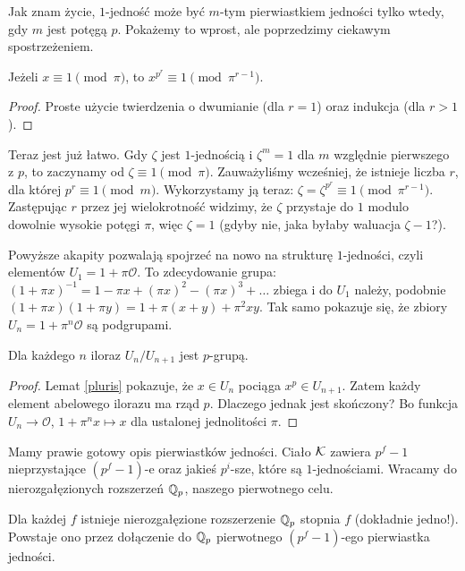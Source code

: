 Jak znam życie, $1$-jedność może być $m$-tym pierwiastkiem jedności tylko wtedy, gdy $m$ jest potęgą $p$.
Pokażemy to wprost, ale poprzedzimy ciekawym spostrzeżeniem.

\begin{lemat}\label{pluris}
	Jeżeli $x \equiv 1 \pmod \pi$, to $x^{p^r} \equiv 1 \pmod {\pi^{r-1}}$.
\end{lemat}

\begin{proof}
	Proste użycie twierdzenia o dwumianie (dla $r = 1$) oraz indukcja (dla $r >1$).
\end{proof}

Teraz jest już łatwo.
Gdy $\zeta$ jest $1$-jednością i $\zeta^m = 1$ dla $m$ względnie pierwszego z $p$, to zaczynamy od $\zeta \equiv 1 \pmod \pi$.
Zauważyliśmy wcześniej, że istnieje liczba $r$, dla której $p^r \equiv 1 \pmod m$.
Wykorzystamy ją teraz: $\zeta = \zeta^{p^r} \equiv 1 \pmod {\pi^{r-1}}$.
Zastępując $r$ przez jej wielokrotność widzimy, że $\zeta$ przystaje do $1$ modulo dowolnie wysokie potęgi $\pi$, więc $\zeta = 1$ (gdyby nie, jaka byłaby waluacja $\zeta - 1$?).

Powyższe akapity pozwalają spojrzeć na nowo na strukturę $1$-jedności, czyli elementów $U_1 = 1 + \pi \mathcal O$.
To zdecydowanie grupa: $(1+\pi x)^{-1} = 1 - \pi x + (\pi x)^2 - (\pi x)^3 + \dots$ zbiega i do $U_1$ należy, podobnie $(1+\pi x) (1+ \pi y) = 1 + \pi (x+y) + \pi^2xy$.
Tak samo pokazuje się, że zbiory $U_n = 1 + \pi^n \mathcal O$ są podgrupami.

\begin{wniosek}
	Dla każdego $n$ iloraz $U_n / U_{n+1}$ jest $p$-grupą.
\end{wniosek}

\begin{proof}
	Lemat \ref{pluris} pokazuje, że $x \in U_n$ pociąga $x^p \in U_{n+1}$.
	Zatem każdy element abelowego ilorazu ma rząd $p$.
	Dlaczego jednak jest skończony?
	Bo funkcja $U_n \to \mathcal O$, $1 + \pi^n x \mapsto x$ dla ustalonej jednolitości $\pi$.
\end{proof}

Mamy prawie gotowy opis pierwiastków jedności.
Ciało $\mathcal K$ zawiera $p^f-1$ nieprzystające $(p^f-1)$-e oraz jakieś $p^i$-sze, które są $1$-jednościami.
Wracamy do nierozgałęzionych rozszerzeń $\mathbb Q_p$, naszego pierwotnego celu.

\begin{fakt}
	Dla każdej $f$ istnieje nierozgałęzione rozszerzenie $\mathbb Q_p$ stopnia $f$ (dokładnie jedno!).
	Powstaje ono przez dołączenie do $\mathbb Q_p$ pierwotnego $(p^f-1)$-ego pierwiastka jedności.
\end{fakt}

